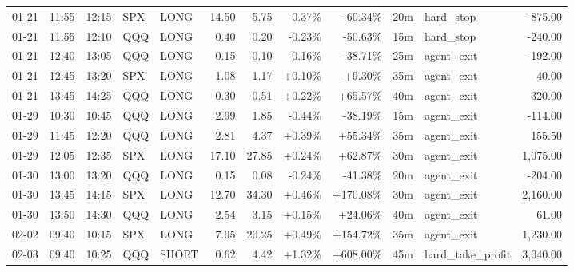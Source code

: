 \documentclass[11pt,a4paper,twoside]{article}
\begin{document}
\begin{center}
\begin{longtable}{>{\color{txtmain}}l l l l l r r r r r >{\color{txtmain}}l r}
01-21 & 11:55 & 12:15 & SPX & LONG & 14.50 & 5.75 & \textcolor{lossred}{-0.37\%} & \textcolor{lossred}{-60.34\%} & 20m & hard\_stop & \textcolor{lossred}{-875.00} \\
01-21 & 11:55 & 12:10 & QQQ & LONG & 0.40 & 0.20 & \textcolor{lossred}{-0.23\%} & \textcolor{lossred}{-50.63\%} & 15m & hard\_stop & \textcolor{lossred}{-240.00} \\
01-21 & 12:40 & 13:05 & QQQ & LONG & 0.15 & 0.10 & \textcolor{lossred}{-0.16\%} & \textcolor{lossred}{-38.71\%} & 25m & agent\_exit & \textcolor{lossred}{-192.00} \\
01-21 & 12:45 & 13:20 & SPX & LONG & 1.08 & 1.17 & \textcolor{wingreen}{+0.10\%} & \textcolor{wingreen}{+9.30\%} & 35m & agent\_exit & \textcolor{wingreen}{40.00} \\
01-21 & 13:45 & 14:25 & QQQ & LONG & 0.30 & 0.51 & \textcolor{wingreen}{+0.22\%} & \textcolor{wingreen}{+65.57\%} & 40m & agent\_exit & \textcolor{wingreen}{320.00} \\
01-29 & 10:30 & 10:45 & QQQ & LONG & 2.99 & 1.85 & \textcolor{lossred}{-0.44\%} & \textcolor{lossred}{-38.19\%} & 15m & agent\_exit & \textcolor{lossred}{-114.00} \\
01-29 & 11:45 & 12:20 & QQQ & LONG & 2.81 & 4.37 & \textcolor{wingreen}{+0.39\%} & \textcolor{wingreen}{+55.34\%} & 35m & agent\_exit & \textcolor{wingreen}{155.50} \\
01-29 & 12:05 & 12:35 & SPX & LONG & 17.10 & 27.85 & \textcolor{wingreen}{+0.24\%} & \textcolor{wingreen}{+62.87\%} & 30m & agent\_exit & \textcolor{wingreen}{1,075.00} \\
01-30 & 13:00 & 13:20 & QQQ & LONG & 0.15 & 0.08 & \textcolor{lossred}{-0.24\%} & \textcolor{lossred}{-41.38\%} & 20m & agent\_exit & \textcolor{lossred}{-204.00} \\
01-30 & 13:45 & 14:15 & SPX & LONG & 12.70 & 34.30 & \textcolor{wingreen}{+0.46\%} & \textcolor{wingreen}{+170.08\%} & 30m & agent\_exit & \textcolor{wingreen}{2,160.00} \\
01-30 & 13:50 & 14:30 & QQQ & LONG & 2.54 & 3.15 & \textcolor{wingreen}{+0.15\%} & \textcolor{wingreen}{+24.06\%} & 40m & agent\_exit & \textcolor{wingreen}{61.00} \\
02-02 & 09:40 & 10:15 & SPX & LONG & 7.95 & 20.25 & \textcolor{wingreen}{+0.49\%} & \textcolor{wingreen}{+154.72\%} & 35m & agent\_exit & \textcolor{wingreen}{1,230.00} \\
02-03 & 09:40 & 10:25 & QQQ & SHORT & 0.62 & 4.42 & \textcolor{wingreen}{+1.32\%} & \textcolor{wingreen}{+608.00\%} & 45m & hard\_take\_profit & \textcolor{wingreen}{3,040.00} \\

\end{longtable}
\end{center}
\end{document}
